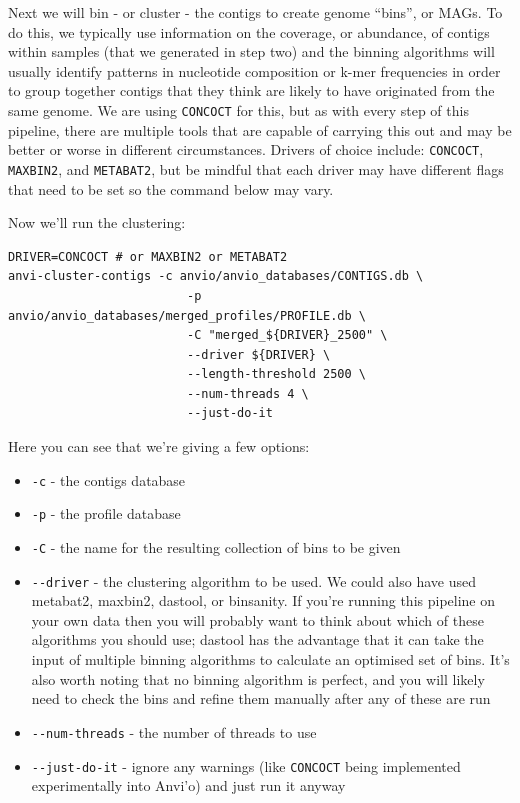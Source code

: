 \documentclass[
]{book}
\providecommand{\tightlist}{%
  \setlength{\itemsep}{0pt}\setlength{\parskip}{0pt}}
\begin{document}
Next we will bin - or cluster - the contigs to create genome ``bins'', or MAGs. To do this, we typically use information on the coverage, or abundance, of contigs within samples (that we generated in step two) and the binning algorithms will usually identify patterns in nucleotide composition or k-mer frequencies in order to group together contigs that they think are likely to have originated from the same genome. We are using \texttt{CONCOCT} for this, but as with every step of this pipeline, there are multiple tools that are capable of carrying this out and may be better or worse in different circumstances. Drivers of choice include: \texttt{CONCOCT}, \texttt{MAXBIN2}, and \texttt{METABAT2}, but be mindful that each driver may have different flags that need to be set so the command below may vary.

Now we'll run the clustering:

\begin{verbatim}
DRIVER=CONCOCT # or MAXBIN2 or METABAT2
anvi-cluster-contigs -c anvio/anvio_databases/CONTIGS.db \
                         -p anvio/anvio_databases/merged_profiles/PROFILE.db \
                         -C "merged_${DRIVER}_2500" \
                         --driver ${DRIVER} \
                         --length-threshold 2500 \
                         --num-threads 4 \
                         --just-do-it
\end{verbatim}

Here you can see that we're giving a few options:

\begin{itemize}
\tightlist
\item
  \texttt{-c} - the contigs database
\item
  \texttt{-p} - the profile database
\item
  \texttt{-C} - the name for the resulting collection of bins to be given
\item
  \texttt{-\/-driver} - the clustering algorithm to be used. We could also have used metabat2, maxbin2, dastool, or binsanity. If you're running this pipeline on your own data then you will probably want to think about which of these algorithms you should use; dastool has the advantage that it can take the input of multiple binning algorithms to calculate an optimised set of bins. It's also worth noting that no binning algorithm is perfect, and you will likely need to check the bins and refine them manually after any of these are run
\item
  \texttt{-\/-num-threads} - the number of threads to use
\item
  \texttt{-\/-just-do-it} - ignore any warnings (like \texttt{CONCOCT} being implemented experimentally into Anvi'o) and just run it anyway
\end{itemize}
\end{document}
